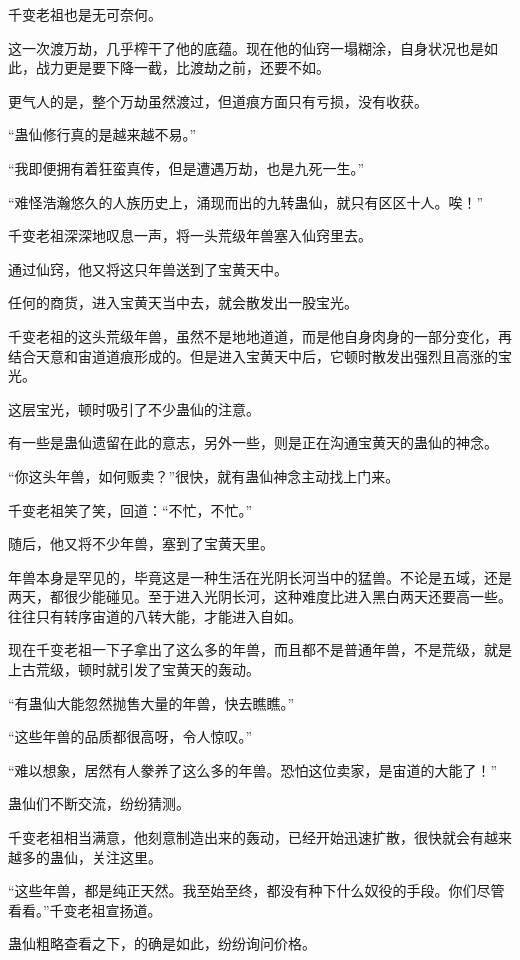 \begin{this_body}
千变老祖也是无可奈何。

这一次渡万劫，几乎榨干了他的底蕴。现在他的仙窍一塌糊涂，自身状况也是如此，战力更是要下降一截，比渡劫之前，还要不如。

更气人的是，整个万劫虽然渡过，但道痕方面只有亏损，没有收获。

“蛊仙修行真的是越来越不易。”

“我即便拥有着狂蛮真传，但是遭遇万劫，也是九死一生。”

“难怪浩瀚悠久的人族历史上，涌现而出的九转蛊仙，就只有区区十人。唉！”

千变老祖深深地叹息一声，将一头荒级年兽塞入仙窍里去。

通过仙窍，他又将这只年兽送到了宝黄天中。

任何的商货，进入宝黄天当中去，就会散发出一股宝光。

千变老祖的这头荒级年兽，虽然不是地地道道，而是他自身肉身的一部分变化，再结合天意和宙道道痕形成的。但是进入宝黄天中后，它顿时散发出强烈且高涨的宝光。

这层宝光，顿时吸引了不少蛊仙的注意。

有一些是蛊仙遗留在此的意志，另外一些，则是正在沟通宝黄天的蛊仙的神念。

“你这头年兽，如何贩卖？”很快，就有蛊仙神念主动找上门来。

千变老祖笑了笑，回道：“不忙，不忙。”

随后，他又将不少年兽，塞到了宝黄天里。

年兽本身是罕见的，毕竟这是一种生活在光阴长河当中的猛兽。不论是五域，还是两天，都很少能碰见。至于进入光阴长河，这种难度比进入黑白两天还要高一些。往往只有转序宙道的八转大能，才能进入自如。

现在千变老祖一下子拿出了这么多的年兽，而且都不是普通年兽，不是荒级，就是上古荒级，顿时就引发了宝黄天的轰动。

“有蛊仙大能忽然抛售大量的年兽，快去瞧瞧。”

“这些年兽的品质都很高呀，令人惊叹。”

“难以想象，居然有人豢养了这么多的年兽。恐怕这位卖家，是宙道的大能了！”

蛊仙们不断交流，纷纷猜测。

千变老祖相当满意，他刻意制造出来的轰动，已经开始迅速扩散，很快就会有越来越多的蛊仙，关注这里。

“这些年兽，都是纯正天然。我至始至终，都没有种下什么奴役的手段。你们尽管看看。”千变老祖宣扬道。

蛊仙粗略查看之下，的确是如此，纷纷询问价格。


\end{this_body}
